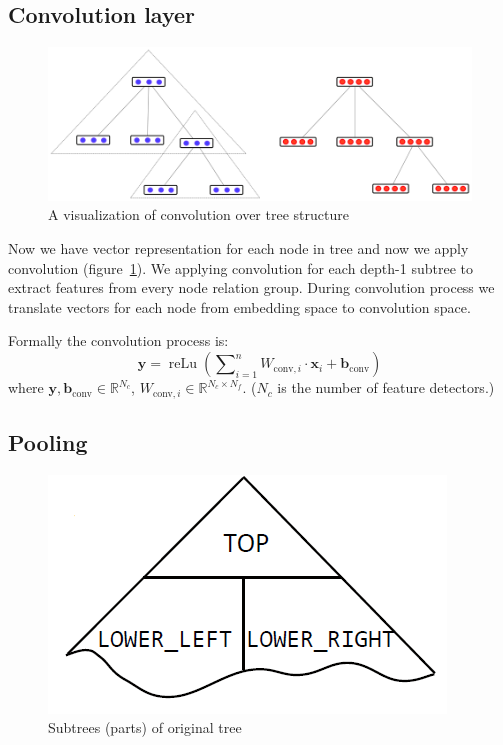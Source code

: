 \documentclass[11pt,technote]{IEEEtran}
\DeclareMathOperator{\relu}{reLu}
\begin{document}
\subsection{Convolution layer}
\begin{figure}
\includegraphics[scale=0.3]{conv_layer.png}
\caption{A visualization of convolution over tree structure}
\label{conv_layer}
\end{figure}
Now we have vector representation for each node in tree and now we apply convolution (figure~\ref{conv_layer}).
We applying convolution for each depth-1 subtree to extract features from every node relation group.
During convolution process we translate vectors for each node from embedding space to convolution space.

Formally the convolution process is:
\begin{equation}\nonumber
\bm y = \relu\left(\sum\nolimits_{i=1}^n W_{\text{conv},i}\cdot\bm x_i +\bm b_{\text{conv}}\right)
\end{equation}
where $\bm y, \bm b_{\text{conv}}\!\!\in\!\mathbb{R}^{N_c}$, $W_{\text{conv},i}\!\!\in\!\mathbb{R}^{N_c\times N_f}$. ($N_c$ is the number of feature detectors.)


\subsection{Pooling}
\begin{figure}
\includegraphics[scale=0.3]{three_way.png}
\caption{Subtrees (parts) of original tree}
\label{three_way}
\end{figure}
\end{document}

